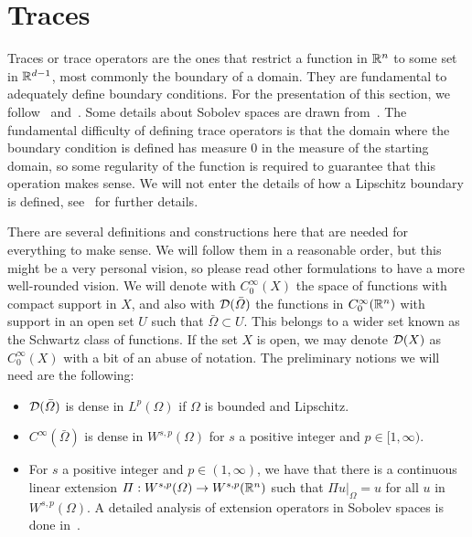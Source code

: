 
\section{Traces}\label{sec:traces}
Traces or trace operators are the ones that restrict a function in $\mathbb{R}^n$ to some set in $\mathbb{R}^{d-1}$, most commonly the boundary of a domain. They are fundamental to adequately define boundary conditions. For the presentation of this section, we follow~\cite{gatica2014simple} and~\cite{monk2003finite}. Some details about Sobolev spaces are drawn from~\cite{adams2003sobolev}. The fundamental difficulty of defining trace operators is that the domain where the boundary condition is defined has measure 0 in the measure of the starting domain, so some regularity of the function is required to guarantee that this operation makes sense. We will not enter the details of how a Lipschitz boundary is defined, see~\cite{monk2003finite} for further details.

There are several definitions and constructions here that are needed for everything to make sense. We will follow them in a reasonable order, but this might be a very personal vision, so please read other formulations to have a more well-rounded vision. We will denote with $C_0^\infty(X)$ the space of functions with compact support in $X$, and also with $\mathcal{D}(\bar\Omega)$ the functions in $C_0^\infty(\mathbb{R}^n)$ with support in an open set $U$ such that $\bar\Omega\subset U$. This belongs to a wider set known as the Schwartz class of functions. If the set $X$ is open, we may denote $\mathcal{D}(X)$ as $C_0^\infty(X)$ with a bit of an abuse of notation.
The preliminary notions we will need are the following:
\begin{itemize}
    \item $\mathcal{D}(\bar\Omega)$ is dense in $L^p(\Omega)$ if $\Omega$ is bounded and Lipschitz.
    \item $C^\infty(\bar\Omega)$ is dense in $W^{s,p}(\Omega)$ for $s$ a positive integer and $p\in [1,\infty)$.
    \item For $s$ a positive integer and $p\in (1,\infty)$, we have that there is a continuous linear extension $\Pi: W^{s,p}(\Omega) \to W^{s,p}(\mathbb{R}^n)$ such that $\Pi u|_\Omega = u$ for all $u$ in $W^{s,p}(\Omega)$. A detailed analysis of extension operators in Sobolev spaces is done in~\cite[Section 9.2]{BrezisFA}.
\end{itemize}


